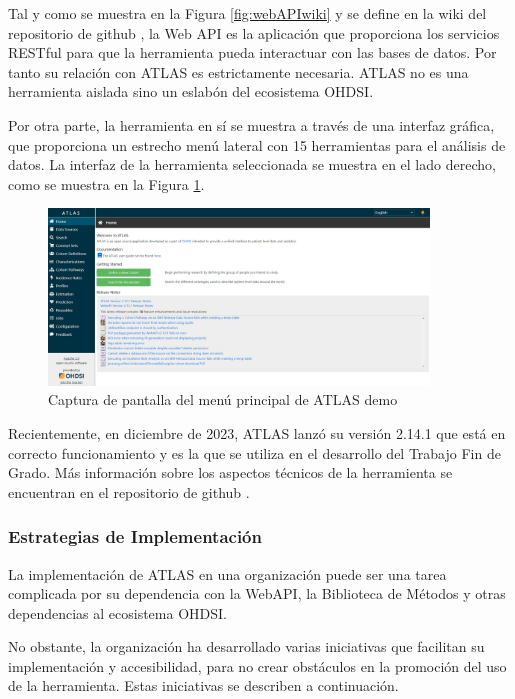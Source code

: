 Tal y como se muestra en la Figura \ref{fig:webAPIwiki} y se define en la wiki del repositorio de github \cite{githubWebAPIwiki}, la Web API es la aplicación que proporciona los servicios RESTful para que la herramienta pueda interactuar con las bases de datos. Por tanto su relación con ATLAS es estrictamente necesaria. ATLAS no es una herramienta aislada sino un eslabón del ecosistema OHDSI.

Por otra parte, la herramienta en sí se muestra a través de una interfaz gráfica, que proporciona un estrecho menú lateral con 15 herramientas para el análisis de datos. La interfaz de la herramienta seleccionada se muestra en el lado derecho, como se muestra en la Figura \ref{fig:ATLASdemoHome}.

\begin{figure}[H]
\centering
\includegraphics[width=0.90\textwidth]{figures/ATLASdemoHome.png}
     \caption{Captura de pantalla del menú principal de ATLAS demo}
    \label{fig:ATLASdemoHome}
\end{figure}

Recientemente, en diciembre de 2023, ATLAS lanzó su versión 2.14.1 que está en correcto funcionamiento y es la que se utiliza en el desarrollo del Trabajo Fin de Grado. Más información sobre los aspectos técnicos de la herramienta se encuentran en el repositorio de github \cite{githubATLAS}.

\subsubsection{Estrategias de Implementación}

La implementación de ATLAS en una organización puede ser una tarea complicada por su dependencia con la WebAPI, la Biblioteca de Métodos y otras dependencias al ecosistema OHDSI. 

No obstante, la organización ha desarrollado varias iniciativas que facilitan su implementación y accesibilidad, para no crear obstáculos en la promoción del uso de la herramienta. Estas iniciativas se describen a continuación.

